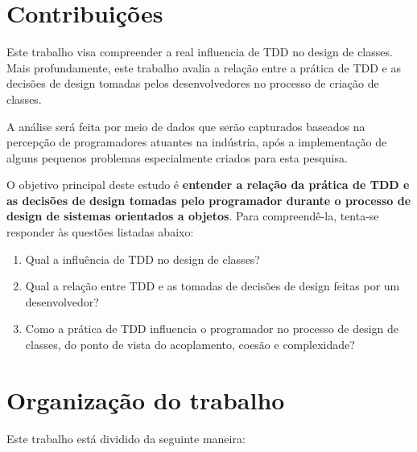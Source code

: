 \section{Contribuições}

Este trabalho
visa compreender a real influencia de TDD no design de classes.
Mais profundamente, este trabalho avalia a relação entre a prática de 
TDD
e as decisões de design tomadas pelos desenvolvedores no processo de 
criação de classes.

A análise será feita por meio de dados que serão
capturados baseados na percepção de programadores atuantes na indústria, após
a implementação de alguns pequenos problemas especialmente criados para
esta pesquisa.

O objetivo principal deste estudo é \textbf{entender a relação da prática de TDD 
e as decisões de design tomadas pelo programador durante o processo de 
design de sistemas orientados a objetos}.
Para compreendê-la, tenta-se responder às questões listadas
abaixo:

\begin{enumerate}

	\item Qual a influência de TDD no design de classes?

	\item Qual a relação entre TDD e as tomadas de decisões de design
	feitas por um desenvolvedor?

	\item Como a prática de TDD influencia o programador no processo de  
	design de classes, do ponto de vista do acoplamento, coesão e complexidade?

\end{enumerate}

\section{Organização do trabalho}

Este trabalho está dividido da seguinte maneira: 

